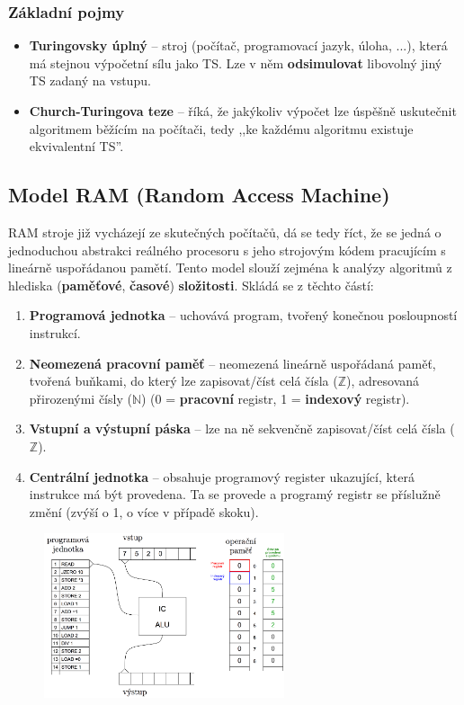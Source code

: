 \subsubsection{Základní pojmy}
\begin{itemize}
\item \textbf{Turingovsky úplný} -- stroj (počítač, programovací jazyk, úloha, ...), která má stejnou výpočetní sílu jako TS. Lze v něm \textbf{odsimulovat} libovolný jiný TS zadaný na vstupu.
\item \textbf{Church-Turingova teze} -- říká, že jakýkoliv výpočet lze úspěšně uskutečnit algoritmem běžícím na počítači, tedy ,,ke každému algoritmu existuje ekvivalentní TS''.
\end{itemize}

\subsection{Model RAM (Random Access Machine)}
RAM stroje již vycházejí ze skutečných počítačů, dá se tedy říct, že se jedná o jednoduchou abstrakci reálného procesoru s jeho strojovým kódem pracujícím s lineárně uspořádanou pamětí. Tento model slouží zejména k analýzy algoritmů z hlediska (\textbf{paměťové}, \textbf{časové}) \textbf{složitosti}. Skládá se z těchto částí:
\begin{enumerate}
\item \textbf{Programová jednotka} -- uchovává program, tvořený konečnou posloupností instrukcí.
\item \textbf{Neomezená pracovní paměť} -- neomezená lineárně uspořádaná paměť, tvořená buňkami, do který lze zapisovat/číst celá čísla ($\mathbb{Z}$), adresovaná přirozenými čísly ($\mathbb{N}$) (0 = \textbf{pracovní} registr, 1 = \textbf{indexový} registr).
\item \textbf{Vstupní a výstupní páska} -- lze na ně sekvenčně zapisovat/číst celá čísla ($\mathbb{Z}$).
\item \textbf{Centrální jednotka} -- obsahuje programový register ukazující, která instrukce má být provedena. Ta se provede a programý registr se příslužně změní (zvýší o 1, o více v případě skoku).
\end{enumerate}

\begin{figure}[!ht]
\centering
\includegraphics[width=0.63\textwidth]{assets/ram}
\end{figure}

